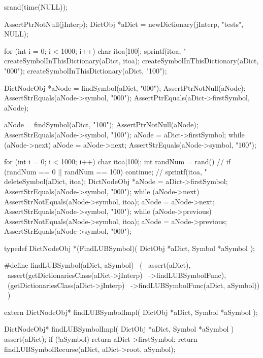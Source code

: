 \startCTest
  srand(time(NULL));

  AssertPtrNotNull(jInterp);
  DictObj *aDict = newDictionary(jInterp, "tests", NULL);

  for (int i = 0; i < 1000; i++) {
    char itoa[100];
    sprintf(itoa, "%
    createSymbolInThisDictionary(aDict, itoa);
  }
  createSymbolInThisDictionary(aDict, "000");
  createSymbolInThisDictionary(aDict, "100");

  DictNodeObj *aNode = findSymbol(aDict, "000");
  AssertPtrNotNull(aNode);
  AssertStrEquals(aNode->symbol, "000");
  AssertPtrEquals(aDict->firstSymbol, aNode);
  
  aNode = findSymbol(aDict, "100");
  AssertPtrNotNull(aNode);
  AssertStrEquals(aNode->symbol, "100");
  aNode = aDict->firstSymbol;
  while (aNode->next) aNode = aNode->next;
  AssertStrEquals(aNode->symbol, "100");
  
  for (int i = 0; i < 1000; i++) {
    char itoa[100];
    int randNum = rand() %
    //
    if (randNum == 0 || randNum == 100) continue;
    //
    sprintf(itoa, "%
    deleteSymbol(aDict, itoa);
    DictNodeObj *aNode = aDict->firstSymbol;
    AssertStrEquals(aNode->symbol, "000");
    while (aNode->next) {
      AssertStrNotEquals(aNode->symbol, itoa);
      aNode = aNode->next;
    }
    AssertStrEquals(aNode->symbol, "100");   
    while (aNode->previous) {
      AssertStrNotEquals(aNode->symbol, itoa);
      aNode = aNode->previous;
    }
    AssertStrEquals(aNode->symbol, "000");
  }  
\stopCTest
\stopTestCase
\stopTestSuite

\startTestSuite[findLUBSymbol]
\startCHeader
typedef DictNodeObj *(FindLUBSymbol)(
  DictObj *aDict,
  Symbol  *aSymbol
);

#define findLUBSymbol(aDict, aSymbol)           \
  (                                             \
    assert(aDict),                              \
    assert(getDictionariesClass(aDict->jInterp) \
      ->findLUBSymbolFunc),                     \
    (getDictionariesClass(aDict->jInterp)       \
      ->findLUBSymbolFunc(aDict, aSymbol))      \
  )
\stopCHeader

\setCHeaderStream{private}
\startCHeader
extern DictNodeObj* findLUBSymbolImpl(
  DictObj *aDict,
  Symbol  *aSymbol
);
\stopCHeader
\setCHeaderStream{public}

\startCCode
DictNodeObj* findLUBSymbolImpl(
  DictObj *aDict,
  Symbol  *aSymbol
) {
  assert(aDict);
  if (!aSymbol) return aDict->firstSymbol;
  return findLUBSymbolRecurse(aDict, aDict->root, aSymbol);
}
\stopCCode
\stopTestSuite

